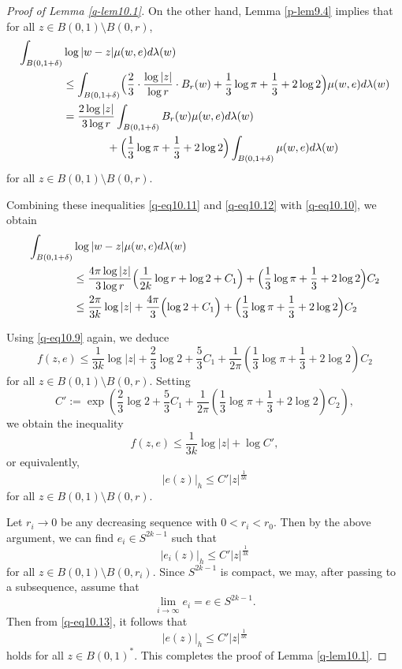 \documentclass[12pt,twoside]{amsart}
\theoremstyle{definition}
\begin{document}
\begin{proof}[Proof of Lemma \ref{q-lem10.1}]
On the other hand, Lemma \ref{p-lem9.4} implies 
that for all $z \in B(0,1) \setminus B(0,r)$,
\begin{equation}\label{q-eq10.12}
\begin{split}
\int_{B(0,1+\delta)}
&\log |w-z|\mu(w,e) d\lambda(w) \\
&\le
\int_{B(0,1+\delta)}
\Bigl(
\frac{2}{3}\cdot\frac{\log |z|}{\log r}\cdot 
B_r(w)+\frac{1}{3}\log \pi+\frac{1}{3}+2\log 2
\Bigr)
\mu(w,e) d\lambda(w) \\
&=
\frac{2\log|z|}{3\log r}
\int_{B(0,1+\delta)}
B_r(w)\mu(w,e) d\lambda(w) \\
&\qquad \qquad
+
\Bigl(\frac{1}{3}\log \pi+\frac{1}{3}+2\log 2\Bigr)
\int_{B(0,1+\delta)}\mu(w,e) d\lambda(w)
\end{split}
\end{equation}
for all $z \in B(0,1) \setminus B(0,r)$.

Combining these inequalities \eqref{q-eq10.11} and 
\eqref{q-eq10.12} with \eqref{q-eq10.10}, we obtain
\begin{align*}
\int_{B(0,1+\delta)}
&\log |w-z|\mu(w,e) d\lambda(w) \\
&\le
\frac{4\pi\log|z|}{3\log r}
\Bigl(\frac{1}{2k}\log r+\log 2+C_1\Bigr)
+
\Bigl(\frac{1}{3}\log \pi+\frac{1}{3}+2\log 2\Bigr)
C_2 \\
&\le
\frac{2\pi}{3k}\log |z|
+\frac{4\pi}{3}
\Bigl(\log 2+C_1\Bigr)
+
\Bigl(\frac{1}{3}\log \pi+\frac{1}{3}+2\log 2\Bigr)
C_2
\end{align*}

Using \eqref{q-eq10.9} again, we deduce
\[
f(z,e) \le \frac{1}{3k} \log |z|
+ \frac{2}{3} \log 2 + \frac{5}{3} C_1
+ \frac{1}{2\pi}
\left( \frac{1}{3} \log \pi + \frac{1}{3} + 2 \log 2 \right) C_2
\]
for all $z \in B(0,1) \setminus B(0,r)$. Setting
\[
C' := 
\exp \left(
\frac{2}{3} \log 2 + \frac{5}{3} C_1
+ \frac{1}{2\pi} 
\left( \frac{1}{3} \log \pi + \frac{1}{3} + 2 \log 2 \right) C_2
\right),
\]
we obtain the inequality
\[
f(z,e) \le \frac{1}{3k} \log |z| + \log C',
\] 
or equivalently,  
\[ 
|e(z)|_h \le C' |z|^{\frac{1}{3k}}
\]
for all $z \in B(0,1) \setminus B(0,r)$.

Let $r_i \to 0$ be any decreasing sequence with $0 < r_i < r_0$.  
Then by the above argument, we can find $e_i \in S^{2k-1}$ such that
\begin{equation}\label{q-eq10.13}
|e_i(z)|_h \le C' |z|^{\frac{1}{3k}}
\end{equation}
for all $z \in B(0,1) \setminus B(0,r_i)$.
Since $S^{2k-1}$ is compact, we may, after passing to a subsequence, assume that
\[
\lim_{i \to \infty} e_i = e \in S^{2k-1}.
\]
Then from \eqref{q-eq10.13}, it follows that
\[
|e(z)|_h \le C' |z|^{\frac{1}{3k}}
\]
holds for all $z \in B(0,1)^*$.  
This completes the proof of Lemma \ref{q-lem10.1}.
\end{proof}
\end{document}
